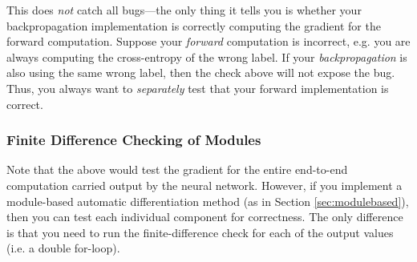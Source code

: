 \documentclass[11pt]{exam}
\numberwithin{equation}{section} %
\numberwithin{figure}{section} %
\numberwithin{table}{section} %
\begin{document}
This does \emph{not} catch all bugs---the only thing it tells you is whether your backpropagation implementation is correctly computing the gradient for the forward computation. Suppose your \emph{forward} computation is incorrect, e.g. you are always computing the cross-entropy of the wrong label. If your \emph{backpropagation} is also using the same wrong label, then the check above will not expose the bug. Thus, you always want to \emph{separately} test that your forward implementation is correct.

\subsubsection{Finite Difference Checking of Modules}

Note that the above would test the gradient for the entire end-to-end computation carried output by the neural network. However, if you implement a module-based automatic differentiation method (as in Section \ref{sec:modulebased}), then you can test each individual component for correctness. The only difference is that you need to run the finite-difference check for each of the output values (i.e. a double for-loop). 

%
%

\end{document}

